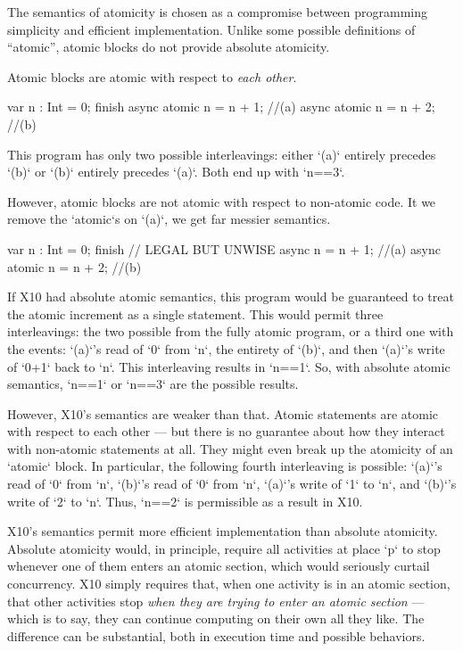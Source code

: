 The semantics of atomicity is chosen as a compromise between programming
simplicity and efficient implementation.  Unlike some possible definitions of
``atomic'', atomic blocks do not provide absolute atomicity.  

Atomic blocks are atomic with respect to {\em each other}.
\begin{xten}
var n : Int = 0;
finish {
  async atomic n = n + 1; //(a)
  async atomic n = n + 2; //(b)
}
\end{xten}
This program has only two possible interleavings: either \xcd`(a)` entirely
precedes \xcd`(b)` or \xcd`(b)` entirely precedes \xcd`(a)`.  Both end up with
\xcd`n==3`. 


However, atomic blocks are not atomic with respect to non-atomic code.  It we
remove the  \xcd`atomic`s on \xcd`(a)`, we get far messier semantics.
\begin{xten}
var n : Int = 0;
finish {
  // LEGAL BUT UNWISE 
  async n = n + 1;          //(a)
  async atomic n = n + 2;   //(b)
}
\end{xten}

If X10 had absolute atomic semantics, this program would be guaranteed to
treat the atomic increment as a single statement.  This would permit three
interleavings: the two possible from the fully atomic program, or a third one
with the events:  \xcd`(a)`'s read of \xcd`0` from \xcd`n`, the entirety of
\xcd`(b)`, and then \xcd`(a)`'s write of \xcd`0+1` back to \xcd`n`.  This
interleaving results in \xcd`n==1`. So, with absolute atomic semantics,
\xcd`n==1` or \xcd`n==3` are the possible results.

However, X10's semantics are weaker than that.  Atomic statements are atomic
with respect to each other --- but there is no guarantee about how they
interact with non-atomic statements at all.  They might even break up the
atomicity of an \xcd`atomic` block.
In particular, the following
fourth interleaving is possible: \xcd`(a)`'s read of \xcd`0` from \xcd`n`, 
\xcd`(b)`'s read of \xcd`0` from \xcd`n`, \xcd`(a)`'s write of \xcd`1` to
\xcd`n`, and \xcd`(b)`'s write of \xcd`2` to \xcd`n`.   Thus, \xcd`n==2` is
permissible as a result in X10.

X10's semantics permit more efficient implementation than absolute atomicity.
Absolute atomicity would, in principle, require all activities at place
\xcd`p` to stop whenever one of them enters an atomic section, which would
seriously curtail concurrency.  X10 simply requires that, when one activity is
in an atomic section, that other activities stop {\em when they are trying to
enter an atomic section} --- which is to say, they can continue computing on
their own all they like.  The difference can be substantial, both in execution
time and possible behaviors.

